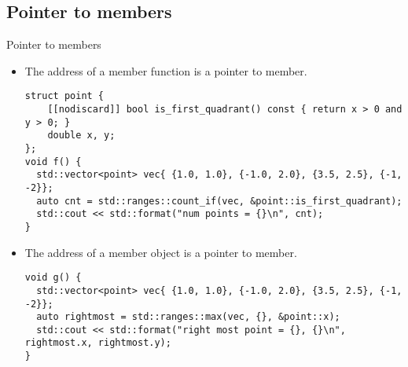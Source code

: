 \subsection{Pointer to members}

\begin{frame}[t,fragile]{Pointer to members}
\begin{itemize}
  \item The address of a member function is a pointer to member.
\begin{lstlisting}
struct point {
    [[nodiscard]] bool is_first_quadrant() const { return x > 0 and y > 0; }
    double x, y;
};
void f() {
  std::vector<point> vec{ {1.0, 1.0}, {-1.0, 2.0}, {3.5, 2.5}, {-1, -2}};
  auto cnt = std::ranges::count_if(vec, &point::is_first_quadrant);
  std::cout << std::format("num points = {}\n", cnt);
}
\end{lstlisting}

  \item The address of a member object is a pointer to member. 
\begin{lstlisting}
void g() {
  std::vector<point> vec{ {1.0, 1.0}, {-1.0, 2.0}, {3.5, 2.5}, {-1, -2}};
  auto rightmost = std::ranges::max(vec, {}, &point::x);
  std::cout << std::format("right most point = {}, {}\n", rightmost.x, rightmost.y);
}
\end{lstlisting}
\end{itemize}
\end{frame}
